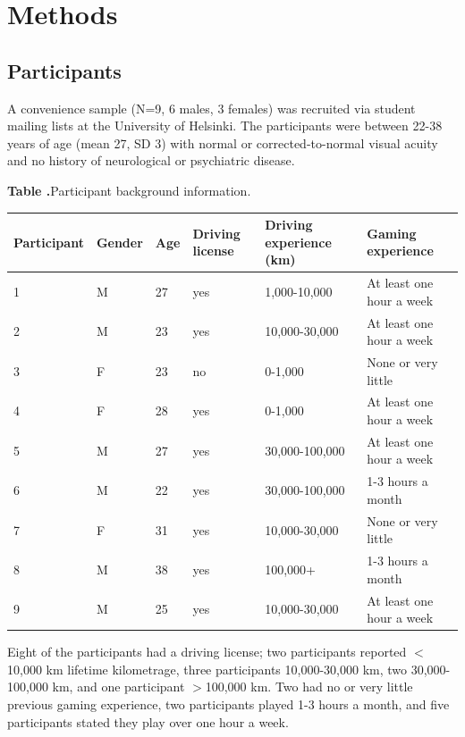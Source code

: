\documentclass{frontierstyle/frontiersSCNS}
\begin{document}
\section{Methods}

\subsection{Participants}
A convenience sample (N=9, 6 males, 3 females) was recruited via student mailing lists at the University of Helsinki. The participants were between 22-38 years of age (mean 27, SD 3) with normal or corrected-to-normal visual acuity and no history of neurological or psychiatric disease.

\begin{table}[ht]
  \centering
  \textbf{\label{tab:Participants} Table .}{Participant background information.}
  \begin{tabular}{llllll}
  \hline
  Participant & Gender & Age & Driving license & Driving experience (km) & Gaming experience \\
  \hline
  1 & M & 27 & yes & 1,000-10,000 & At least one hour a week \\
  2 & M & 23 & yes & 10,000-30,000 & At least one hour a week \\
  3 & F & 23 & no & 0-1,000 & None or very little \\
  4 & F & 28 & yes & 0-1,000 & At least one hour a week \\
  5 & M & 27 & yes & 30,000-100,000 & At least one hour a week \\
  6 & M & 22 & yes & 30,000-100,000 & 1-3 hours a month \\
  7 & F & 31 & yes & 10,000-30,000 & None or very little \\
  8 & M & 38 & yes & 100,000+ & 1-3 hours a month \\
  9 & M & 25 & yes & 10,000-30,000 & At least one hour a week \\
  \hline
  \end{tabular}
\end{table}

Eight of the participants had a driving license; two participants reported $<$10,000 km lifetime kilometrage, three participants 10,000-30,000 km, two 30,000-100,000 km, and one participant $>$100,000 km. Two had no or very little previous gaming experience, two participants played 1-3 hours a month, and five participants stated they play over one hour a week.
\end{document}
